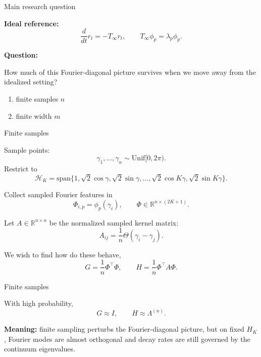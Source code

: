 \documentclass[10pt,aspectratio=169]{beamer}
\begin{document}
\begin{frame}{Main research question}

	\textbf{Ideal reference:}
	\[
		\frac{d}{dt}r_t=-T_\infty r_t,
		\qquad
		T_\infty\phi_p=\lambda_p\phi_p.
	\]

	\pause
	\textbf{Question:}

	\medskip

	How much of this Fourier-diagonal picture survives when we move away from the idealized setting?

	\pause
	\begin{enumerate}
		\item finite samples \(n\)
		\item finite width \(m\)
	\end{enumerate}


\end{frame}

\begin{frame}{Finite samples}

	Sample points:
	\[
		\gamma_1,\ldots,\gamma_n \sim \mathrm{Unif}[0,2\pi).
	\]
	Restrict to
	\[
		\mathcal H_K=\mathrm{span}\{1,\sqrt{2}\cos\gamma,\sqrt{2}\sin\gamma,\ldots,
		\sqrt{2}\cos K\gamma,\sqrt{2}\sin K\gamma\}.
	\]

	\pause
	Collect sampled Fourier features in
	\[
		\Phi_{i,p}=\phi_p(\gamma_i),
		\qquad
		\Phi\in\mathbb R^{n\times (2K+1)}.
	\]

	Let \(A\in\mathbb R^{n\times n}\) be the normalized sampled kernel matrix:
	\[
		A_{ij}
		=
		\frac1n\Theta(\gamma_i-\gamma_j).
	\]

	\pause
	We wish to find how do these behave,
	\[
		G=\frac1n\Phi^\top\Phi,
		\qquad
		H=\frac1n\Phi^\top A\Phi .
	\]


\end{frame}

\begin{frame}{Finite samples}

	With high probability,
	\[
		G\approx I,
		\qquad
		H\approx \Lambda^{(n)}.
	\]

	\textbf{Meaning:} finite sampling perturbs the Fourier-diagonal picture, but on fixed \(H_K\), Fourier modes are
	almost orthogonal and decay rates are still governed by the continuum eigenvalues.

\end{frame}
\end{document}
